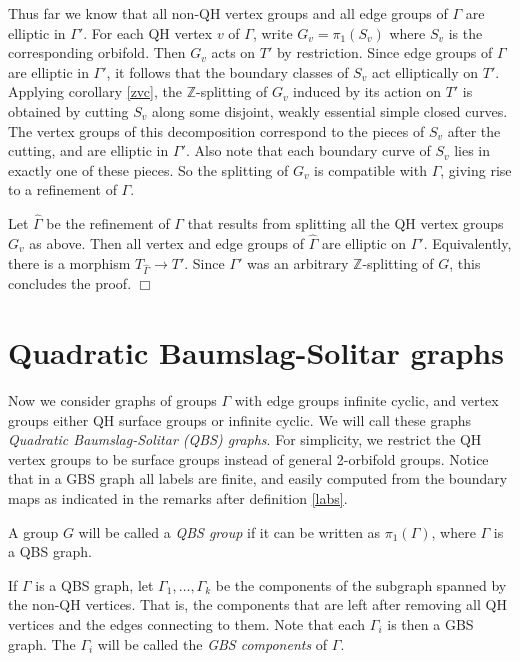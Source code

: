 \documentclass[12pt]{amsart}
\newcommand{\Z}{\mathbb{Z}}
\begin{document}
Thus far we know that all non-QH vertex groups and all edge groups of $\Gamma$ are elliptic in $\Gamma'$. For each QH vertex $v$ of $\Gamma$, write $G_v=\pi_1(S_v)$ where $S_v$ is the corresponding orbifold. Then $G_v$ acts on $T'$ by restriction. Since edge groups of $\Gamma$ are elliptic in $\Gamma'$, it follows that the boundary classes of $S_v$ act elliptically on $T'$. Applying corollary \ref{zvc}, the $\Z$-splitting of $G_v$ induced by its action on $T'$ is obtained by cutting $S_v$ along some disjoint, weakly essential simple closed curves. The vertex groups of this decomposition correspond to the pieces of $S_v$ after the cutting, and are elliptic in $\Gamma'$. Also note that each boundary curve of $S_v$ lies in exactly one of these pieces. So the splitting of $G_v$ is compatible with $\Gamma$, giving rise to a refinement of $\Gamma$. 

Let $\hat \Gamma$ be the refinement of $\Gamma$ that results from splitting all the QH vertex groups $G_v$ as above. Then all vertex and edge groups of $\hat \Gamma$ are elliptic on $\Gamma'$. Equivalently, there is a morphism $T_{\hat \Gamma} \to T'$. Since $\Gamma'$ was an arbitrary $\Z$-splitting of $G$, this concludes the proof. $\Box$



\section{Quadratic Baumslag-Solitar graphs} \label{s-qbs}

Now we consider graphs of groups $\Gamma$ with edge groups infinite cyclic, and vertex groups either QH surface groups or infinite cyclic. We will call these graphs {\em Quadratic Baumslag-Solitar (QBS) graphs}. For simplicity, we restrict the QH vertex groups to be surface groups instead of general 2-orbifold groups. Notice that in a GBS graph all labels are finite, and easily computed from the boundary maps as indicated in the remarks after definition \ref{labs}.

A group $G$ will be called a {\em QBS group} if it can be written as $\pi_1(\Gamma)$, where $\Gamma$ is a QBS graph.

If $\Gamma$ is a QBS graph, let $\Gamma_1,\ldots,\Gamma_k$ be the components of the subgraph spanned by the non-QH vertices. That is, the components that are left after removing all QH vertices and the edges connecting to them. Note that each $\Gamma_i$ is then a GBS graph. The $\Gamma_i$ will be called the {\em GBS components} of $\Gamma$.
\end{document}
